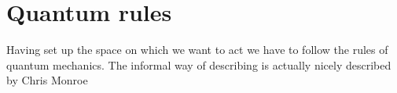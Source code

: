 \section{Quantum rules}
Having set up the space on which we want to act we have to follow the rules of quantum mechanics. The informal way of describing is actually nicely described by Chris Monroe